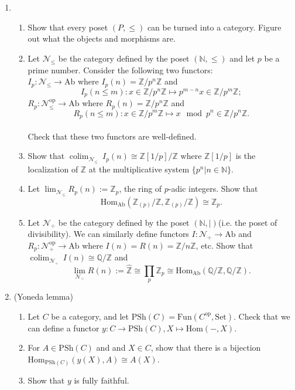 \documentclass[a4paper,11pt]{article}
\def\bb#1{\mathbb{#1}}
\def\bZ{\mathbb{Z}}
\def\Zmd#1{\bZ/#1\bZ}
\def\mrm#1{\mathrm{#1}}
\def\Hom{\mathrm{Hom}}
\def\Ab{\mathrm{Ab}}
\def\PSh{\mathrm{PSh}}
\DeclareMathOperator{\colim}{colim}
\begin{document}
\begin{enumerate}[1.]
\item
\begin{enumerate}
    \item Show that every poset $(P,\leq)$ can be turned into a category. Figure out what the objects and morphisms are.
    \item Let $ \mathcal{N}_{\leq} $ be the category defined by the poset $ (\bb{N},\leq)$ and let $p$ be a prime number. Consider the following two functors: \\$I_p: \mathcal{N}_{\leq} \to \mrm{Ab} $ where $I_p(n)=\Zmd{p^n}$ and 
    \[
    I_p(n\leq m): x\in \Zmd{p^n} \mapsto p^{m-n}x\in \Zmd{p^m} ;
    \]
    $R_p: \mathcal{N}_{\leq}^{\mrm{op}} \to \mrm{Ab} $ where $R_p(n)=\Zmd{p^n}$ and 
    \[
    R_p(n\leq m): x \in \Zmd{p^m} \mapsto x \mod p^n \in \Zmd{p^n}.
    \]
    \\ Check that these two functors are well-defined.
    \item Show that $\colim_{\mathcal{N}_{\leq}}\  I_p(n) \cong \bZ[1/p]/\bZ $ where $\bZ[1/p]$ is the localization of $\bZ$ at the multiplicative system $\{p^n\vert n\in \mathbb{N}\}$.
    \item Let $\lim_{\mathcal{N}_{\leq}}  R_p(n) := \bZ_p$, the ring of $p$-adic integers. Show that 
    \[
    \Hom_{\Ab}(\bZ_{(p)}/\bZ ,\bZ_{(p)}/\bZ )\cong \bZ_p.
    \] 
    \item Let $ \mathcal{N}_{\div} $ be the category defined by the poset $ (\bb{N},\mid )$(i.e. the poset of divisibility). We can similarly define functors $I :\mathcal{N}_{\div} \to \mrm{Ab}$ and $R_p: \mathcal{N}_{\div}^{\mrm{op}} \to \mrm{Ab} $ where $I(n)=R(n)=\Zmd{n}$, etc. Show that $\colim_{\mathcal{N}_{\div}}\ I(n) \cong \bb{Q}/\bZ$ and 
    \[
    \lim_{\mathcal{N}_{\div}} R(n) := \hat{\bZ} \cong \prod _p \bZ_p \cong \Hom_{\Ab}(\bb{Q}/\bZ,\bb{Q}/\bZ).
    \] 
\end{enumerate}
\item (Yoneda lemma) 
\begin{enumerate}
    \item Let $C$ be a category, and let $  \PSh(C)=\mrm{Fun}(C^{\mrm{op}},\mrm{Set}) $. Check that we can define a functor $y: C\to \PSh(C), X \mapsto \Hom(-,X)$.
    \item For $A\in \PSh(C)$ and and $X \in C$, show that there
    is a bijection $\Hom_{\PSh(C)}(y(X),A)\cong A(X)$.
    \item Show that $y$ is fully faithful.
\end{enumerate}


\end{enumerate}
\end{document}
